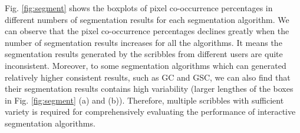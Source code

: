 \documentclass[runningheads,a4paper]{llncs}
\begin{document}
Fig. \ref{fig:segment} shows the boxplots of pixel co-occurrence percentages in different numbers of segmentation results for each segmentation algorithm. We can observe that the pixel co-occurrence percentages declines greatly when the number of segmentation results increases for all the algorithms. It means the segmentation results generated by the scribbles from different users are quite inconsistent. Moreover, to some segmentation algorithms which can generated relatively higher consistent results, such as GC and GSC, we can also find that their segmentation results contains high variability (larger lengthes of the boxes in Fig. \ref{fig:segment} (a) and (b)). Therefore, multiple scribbles with sufficient variety is required for comprehensively evaluating the performance of interactive segmentation algorithms.


\end{document}
